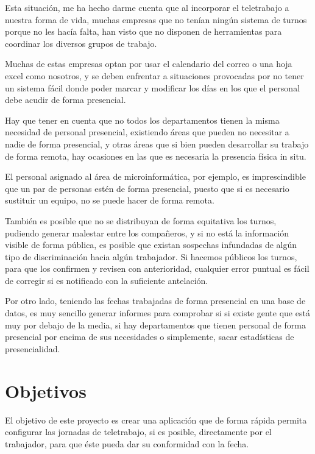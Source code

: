 \documentclass[11pt,spanish,listoffigures,listoftables]{tfgetsinf}
\begin{document}
Esta situación, me ha hecho darme cuenta que al incorporar el teletrabajo a nuestra forma de vida, muchas empresas que no tenían ningún sistema de turnos porque no les hacía falta, han visto que no disponen de herramientas para coordinar los diversos grupos de trabajo.

Muchas de estas empresas optan por usar el calendario del correo o una hoja excel como nosotros, y se deben enfrentar a situaciones provocadas por no tener un sistema fácil donde poder marcar y modificar los días en los que el personal debe acudir de forma presencial.

Hay que tener en cuenta que no todos los departamentos tienen la misma necesidad de personal presencial, existiendo áreas que pueden no necesitar a nadie de forma presencial, 
y otras áreas que si bien pueden desarrollar su trabajo de forma remota, hay ocasiones en las que es necesaria la presencia física in situ. 

El personal asignado al área de microinformática, por ejemplo, es imprescindible que un par de personas estén de forma presencial, puesto que si es necesario sustituir un equipo, no se puede hacer de forma remota.

También es posible que no se distribuyan de forma equitativa los turnos, pudiendo generar malestar entre los compañeros, y si no está la información visible de forma pública, es posible que existan sospechas infundadas de algún tipo de discriminación hacia algún trabajador.
Si hacemos públicos los turnos, para que los confirmen y revisen con anterioridad, cualquier error puntual es fácil de corregir si es notificado con la suficiente antelación.

Por otro lado, teniendo las fechas trabajadas de forma presencial en una base de datos, es muy sencillo generar informes para comprobar si si existe gente que está muy por debajo de la media, si hay departamentos que tienen personal de forma presencial por encima de sus necesidades o simplemente, sacar estadísticas de presencialidad.

%
%
\section{Objetivos}

El objetivo de este proyecto es crear una aplicación que de forma rápida permita configurar las jornadas de teletrabajo, si es posible, directamente por el trabajador, para que éste pueda dar su conformidad con la fecha.
\end{document}
